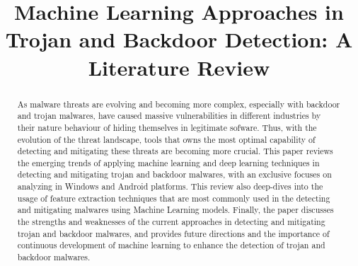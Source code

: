 \documentclass{IEEEtran}[conference]
\begin{document}
\title{Machine Learning Approaches in Trojan and Backdoor Detection: A Literature Review}

\author{
}

\maketitle
\vspace{-2em}
\begin{abstract}
    As malware threats are evolving and becoming more complex, especially with backdoor and trojan malwares, have caused massive vulnerabilities in different industries by their nature behaviour of hiding themselves in legitimate sofware.
    Thus, with the evolution of the threat landscape, tools that owns the most optimal capability of detecting and mitigating these threats are becoming more crucial.
    This paper reviews the emerging trends of applying machine learning and deep learning techniques in detecting and mitigating trojan and backdoor malwares, with an exclusive focuses on analyzing in Windows and Android platforms.
    This review also deep-dives into the usage of feature extraction techniques that are most commonly used in the detecting and mitigating malwares using Machine Learning models. Finally, the paper discusses the strengths and weaknesses of the current
    approaches in detecting and mitigating trojan and backdoor malwares, and provides future directions and the importance of continuous development of machine learning to enhance the detection of trojan and backdoor malwares.
\end{abstract}
\end{document}
